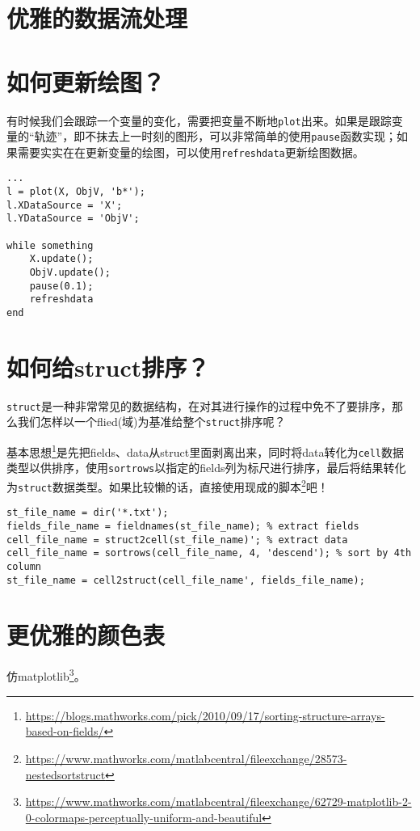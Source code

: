 \section{优雅的数据流处理}

\section{如何更新绘图？}

有时候我们会跟踪一个变量的变化，需要把变量不断地\texttt{plot}出来。如果是跟踪变量的“轨迹”，即不抹去上一时刻的图形，可以非常简单的使用\texttt{pause}函数实现；如果需要实实在在更新变量的绘图，可以使用\texttt{refreshdata}更新绘图数据。

\begin{verbatim}
...
l = plot(X, ObjV, 'b*');
l.XDataSource = 'X';
l.YDataSource = 'ObjV';

while something
    X.update();
    ObjV.update();
    pause(0.1);
    refreshdata
end
\end{verbatim}

\section{如何给struct排序？}

\texttt{struct}是一种非常常见的数据结构，在对其进行操作的过程中免不了要排序，那么我们怎样以一个flied(域)为基准给整个\texttt{struct}排序呢？

基本思想\footnote{\url{https://blogs.mathworks.com/pick/2010/09/17/sorting-structure-arrays-based-on-fields/}}是先把fields、data从struct里面剥离出来，同时将data转化为\texttt{cell}数据类型以供排序，使用\texttt{sortrows}以指定的fields列为标尺进行排序，最后将结果转化为\texttt{struct}数据类型。如果比较懒的话，直接使用现成的脚本\footnote{\url{https://www.mathworks.com/matlabcentral/fileexchange/28573-nestedsortstruct}}吧！

\begin{verbatim}
st_file_name = dir('*.txt');
fields_file_name = fieldnames(st_file_name); % extract fields
cell_file_name = struct2cell(st_file_name)'; % extract data
cell_file_name = sortrows(cell_file_name, 4, 'descend'); % sort by 4th column
st_file_name = cell2struct(cell_file_name', fields_file_name);
\end{verbatim}

\section{更优雅的颜色表}

仿matplotlib\footnote{\url{https://www.mathworks.com/matlabcentral/fileexchange/62729-matplotlib-2-0-colormaps-perceptually-uniform-and-beautiful}}。


